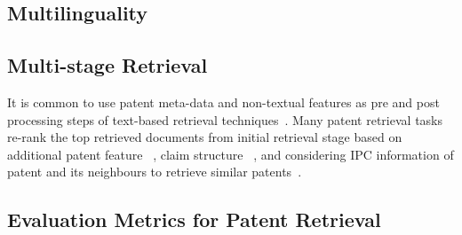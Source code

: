 \subsection{Multilinguality}


\subsection{Multi-stage Retrieval}
It is common to use patent meta-data and non-textual features as pre and post processing steps of text-based retrieval techniques~\citep{lopez2009multiple}. Many patent retrieval tasks re-rank the top retrieved documents from initial retrieval stage based on additional patent feature ~\citep{lopez2010experiments}, claim structure ~\citep{mase2005proposal}, and considering IPC information of patent and its neighbours to retrieve similar patents~\citep{verma2011exploring}. 

\subsection{Evaluation Metrics for Patent Retrieval}



%

